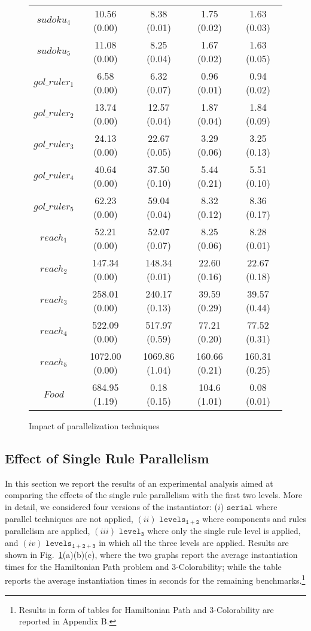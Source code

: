 \documentclass[preprint]{tlp}
\newcommand{\serial}{\ensuremath{\mathtt{serial}}\xspace}
\newcommand{\kali}{\ensuremath{\mathtt{levels_{1\!+\!2}}}\xspace}
\newcommand{\splitonly}{\ensuremath{\mathtt{level_3}}\xspace}
\newcommand{\paral}{\ensuremath{\mathtt{levels_{1\!+\!2\!+\!3}}}\xspace}
\begin{document}
\begin{figure}[t!]
{\begin{tabular}{| c | c | c | c | c |}
$sudoku_4$ & 10.56 (0.00) & 8.38 (0.01) & 1.75 (0.02) & 1.63 (0.03)\\
$sudoku_5$ & 11.08 (0.00) & 8.25 (0.04) & 1.67 (0.02) & 1.63 (0.05)\\
\cline{1-5}
$gol\_ruler_1$ & 6.58 (0.00) & 6.32 (0.07) & 0.96 (0.01) & 0.94 (0.02)\\
$gol\_ruler_2$ & 13.74 (0.00) & 12.57 (0.04) & 1.87 (0.04) & 1.84 (0.09)\\
$gol\_ruler_3$ & 24.13 (0.00) & 22.67 (0.05) & 3.29 (0.06) & 3.25 (0.13)\\
$gol\_ruler_4$ & 40.64 (0.00) & 37.50 (0.10) & 5.44 (0.21) & 5.51 (0.10)\\
$gol\_ruler_5$ & 62.23 (0.00) & 59.04 (0.04) & 8.32 (0.12) & 8.36 (0.17)\\
\cline{1-5}
$reach_1$ & 52.21 (0.00) & 52.07 (0.07) & 8.25 (0.06) & 8.28 (0.01) \\
$reach_2$ & 147.34 (0.00) & 148.34 (0.01) & 22.60 (0.16) & 22.67 (0.18) \\
$reach_3$ & 258.01 (0.00) & 240.17 (0.13) & 39.59 (0.29) & 39.57 (0.44) \\
$reach_4$ & 522.09 (0.00) & 517.97 (0.59) & 77.21 (0.20) & 77.52 (0.31) \\
$reach_5$ & 1072.00 (0.00) & 1069.86 (1.04) & 160.66 (0.21) & 160.31 (0.25) \\
\cline{1-5}
$Food$& 684.95 (1.19)  & 0.18 (0.15) & 104.6 (1.01) & 0.08 (0.01) \\
\cline{1-5}
\end{tabular}
 \label{tab:tec}
}
\centering
{}
\hspace{0.0cm}
\hspace{5mm}
\caption{Impact of parallelization techniques} \label{tab:technique}
\end{figure}


\subsection{Effect of Single Rule Parallelism}

In this section we report the results of an experimental analysis aimed at comparing the effects
of the single rule parallelism with the first two levels.
More in detail, we considered four versions of the instantiator: ($i$) \serial where parallel techniques are not applied,
$(ii)$ \kali where components and rules parallelism are applied,
$(iii)$ \splitonly where only the single rule level is applied, and
$(iv)$ \paral in which all the three levels are applied.
Results are shown in Fig.~\ref{tab:technique}(a)(b)(c), where the two graphs report
the average instantiation times for the Hamiltonian Path problem and 3-Colorability; while the table reports
the average instantiation times in seconds for the remaining benchmarks.\footnote{Results in form of tables for Hamiltonian Path and 3-Colorability are reported in Appendix B.}
\end{document}
